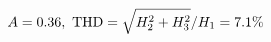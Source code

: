 \documentclass[preview]{standalone}
\begin{document}
\begin{align*}
\special{dvisvgm:raw <g id='unique000'>}A=0.36,\ \text{THD}=\sqrt{H_2^2+H_3^2}/H_1=7.1\%\special{dvisvgm:raw </g>}
\end{align*}
\end{document}
